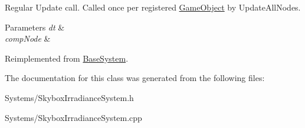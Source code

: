 Regular Update call. Called once per registered \hyperlink{classGameObject}{Game\+Object} by Update\+All\+Nodes. 


\begin{DoxyParams}{Parameters}
{\em dt} & \\
\hline
{\em comp\+Node} & \\
\hline
\end{DoxyParams}


Reimplemented from \hyperlink{classBaseSystem_a465191589a1ef8b8f3a8e20fa4656d47}{Base\+System}.



The documentation for this class was generated from the following files\+:\begin{DoxyCompactItemize}
\item 
Systems/Skybox\+Irradiance\+System.\+h\item 
Systems/Skybox\+Irradiance\+System.\+cpp\end{DoxyCompactItemize}
